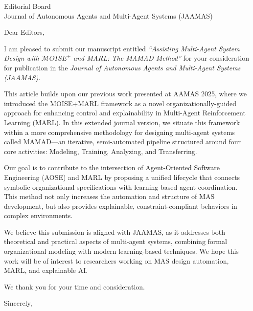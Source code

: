 \documentclass[11pt]{letter}
\date{\today}
\begin{document}
\begin{letter}{Editorial Board\\Journal of Autonomous Agents and Multi-Agent Systems (JAAMAS)}

\opening{Dear Editors,}

I am pleased to submit our manuscript entitled \textit{“Assisting Multi-Agent System Design with $\mathcal{M}OISE^+$ and MARL: The MAMAD Method”} for your consideration for publication in the \textit{Journal of Autonomous Agents and Multi-Agent Systems (JAAMAS)}.

This article builds upon our previous work presented at AAMAS 2025, where we introduced the MOISE+MARL framework as a novel organizationally-guided approach for enhancing control and explainability in Multi-Agent Reinforcement Learning (MARL). In this extended journal version, we situate this framework within a more comprehensive methodology for designing multi-agent systems called MAMAD—an iterative, semi-automated pipeline structured around four core activities: Modeling, Training, Analyzing, and Transferring.

Our goal is to contribute to the intersection of Agent-Oriented Software Engineering (AOSE) and MARL by proposing a unified lifecycle that connects symbolic organizational specifications with learning-based agent coordination. This method not only increases the automation and structure of MAS development, but also provides explainable, constraint-compliant behaviors in complex environments.

We believe this submission is aligned with JAAMAS, as it addresses both theoretical and practical aspects of multi-agent systems, combining formal organizational modeling with modern learning-based techniques. We hope this work will be of interest to researchers working on MAS design automation, MARL, and explainable AI.

We thank you for your time and consideration.

\closing{Sincerely,}

\end{letter}
\end{document}
